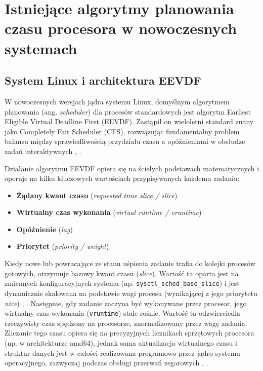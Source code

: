 \chapter{Istniejące algorytmy planowania czasu procesora w nowoczesnych systemach}
\label{ch:wprowadzenie}

\section{System Linux i architektura EEVDF}
W nowoczesnych wersjach jądra systemu Linux, domyślnym algorytmem planowania (ang. \textit{scheduler}) dla procesów standardowych jest algorytm Earliest Eligible Virtual Deadline First (EEVDF). Zastąpił on wieloletni standard znany jako Completely Fair Scheduler (CFS), rozwiązując fundamentalny problem balansu między sprawiedliwością przydziału czasu a opóźnieniami w obsłudze zadań interaktywnych \cite{1}, \cite{38}. 

Działanie algorytmu EEVDF opiera się na ścisłych podstawach matematycznych \cite{15} i operuje na kilku kluczowych wartościach przypisywanych każdemu zadaniu:
\begin{itemize}
	\item \textbf{Żądany kwant czasu} (\textit{requested time slice / slice})
	\item \textbf{Wirtualny czas wykonania} (\textit{virtual runtime / vruntime})
	\item \textbf{Opóźnienie} (\textit{lag})
	\item \textbf{Priorytet} (\textit{priority / weight})
\end{itemize}

Kiedy nowe lub powracające ze stanu uśpienia zadanie trafia do kolejki procesów gotowych, otrzymuje bazowy kwant czasu (\textit{slice}). Wartość ta oparta jest na zmiennych konfiguracyjnych systemu (np. \texttt{sysctl\_sched\_base\_slice}) i jest dynamicznie skalowana na podstawie wagi procesu (wynikającej z jego priorytetu \textit{nice}) \cite{19}, \cite{26}. Następnie, gdy zadanie zaczyna być wykonywane przez procesor, jego wirtualny czas wykonania (\texttt{vruntime}) stale rośnie. Wartość ta odzwierciedla rzeczywisty czas spędzony na procesorze, znormalizowany przez wagę zadania. Zliczanie tego czasu opiera się na precyzyjnych licznikach sprzętowych procesora (np. w architekturze amd64), jednak sama aktualizacja wirtualnego czasu i struktur danych jest w całości realizowana programowo przez jądro systemu operacyjnego, zazwyczaj podczas obsługi przerwań zegarowych \cite{18}, \cite{19}.

